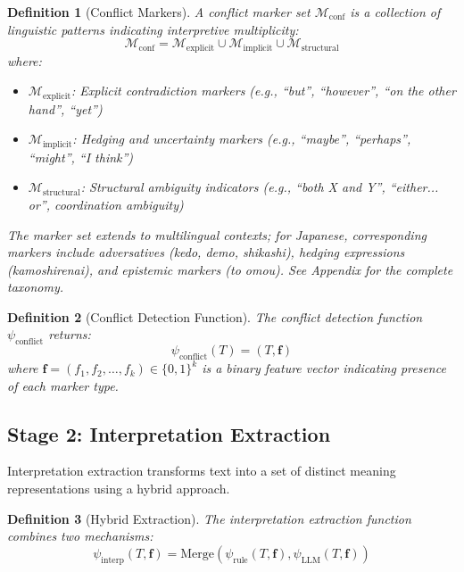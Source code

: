 \documentclass[11pt,a4paper]{article}
\newtheorem{definition}{Definition}
\begin{document}
\begin{definition}[Conflict Markers]
A \textit{conflict marker set} $\mathcal{M}_{\text{conf}}$ is a collection of 
linguistic patterns indicating interpretive multiplicity:
\begin{equation}
\mathcal{M}_{\text{conf}} = \mathcal{M}_{\text{explicit}} \cup \mathcal{M}_{\text{implicit}} \cup \mathcal{M}_{\text{structural}}
\end{equation}
where:
\begin{itemize}
    \item $\mathcal{M}_{\text{explicit}}$: Explicit contradiction markers 
          (e.g., ``but'', ``however'', ``on the other hand'', ``yet'')
    \item $\mathcal{M}_{\text{implicit}}$: Hedging and uncertainty markers 
          (e.g., ``maybe'', ``perhaps'', ``might'', ``I think'')
    \item $\mathcal{M}_{\text{structural}}$: Structural ambiguity indicators 
          (e.g., ``both X and Y'', ``either... or'', coordination ambiguity)
\end{itemize}
The marker set extends to multilingual contexts; for Japanese, corresponding 
markers include adversatives (\textit{kedo}, \textit{demo}, 
\textit{shikashi}), hedging expressions (\textit{kamoshirenai}), 
and epistemic markers (\textit{to omou}). See Appendix for the complete taxonomy.
\end{definition}

\begin{definition}[Conflict Detection Function]
The conflict detection function $\psi_{\text{conflict}}$ returns:
\begin{equation}
\psi_{\text{conflict}}(T) = (T, \mathbf{f})
\end{equation}
where $\mathbf{f} = (f_1, f_2, \ldots, f_k) \in \{0,1\}^k$ is a binary feature 
vector indicating presence of each marker type.
\end{definition}

\subsection{Stage 2: Interpretation Extraction}

Interpretation extraction transforms text into a set of distinct meaning 
representations using a hybrid approach.

\begin{definition}[Hybrid Extraction]
The interpretation extraction function combines two mechanisms:
\begin{equation}
\psi_{\text{interp}}(T, \mathbf{f}) = \text{Merge}(\psi_{\text{rule}}(T, \mathbf{f}), \psi_{\text{LLM}}(T, \mathbf{f}))
\end{equation}
\end{definition}
\end{document}
